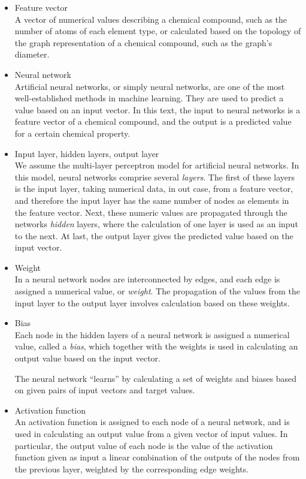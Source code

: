 \documentclass[11pt,titlepage,dvipdfmx,twoside]{article}
\begin{document}
\begin{itemize}
\item Feature vector\\
A vector of numerical values describing a chemical compound, such as the number of
atoms of each element type, or 
calculated based on the topology of the graph representation
of a chemical compound, such as the graph's diameter.

\item Neural network \\
Artificial neural networks, or simply neural networks, 
are one of the most well-established methods in machine learning.
They are used to predict a value based on an input vector.
In this text, the input to neural networks is a feature vector of a chemical compound,
and the output is a predicted value for a certain chemical property.

\item Input layer, hidden layers, output layer \\
We assume the multi-layer perceptron model for artificial neural networks.
In this model, neural networks comprise several {\em layers}.
The first of these layers is the input layer, taking numerical data,
in out case, from a feature vector, and therefore the input layer
has the same number of nodes as elements in the feature vector.
Next, these numeric values are propagated through
the networks {\em hidden} layers, where the calculation of
one layer is used as an input to the next.
At last, the output layer gives the predicted value based on the 
input vector.

\item Weight\\
In a neural network nodes are interconnected by edges, and each edge is assigned a 
numerical value, or {\em weight}.
The propagation of the values from the input layer to the output layer
involves calculation based on these weights.

\item  Bias \\
Each node in the hidden layers of a neural network is
assigned a numerical value, called a {\em bias},
which together with the weights is used in 
calculating an output value based on the input vector.
\medskip

The neural network ``learns'' by calculating a set of weights and biases
based on given pairs of input vectors and target values.

\item Activation function\\
 An activation function is assigned to each node of a neural network, and is used 
 in calculating an output value from a given vector of input values.
 In particular, the output value of each node is the value of the activation function given
 as input a linear combination of the outputs of the nodes from the previous layer, weighted by
 the corresponding edge weights.


\end{itemize}
\end{document}
